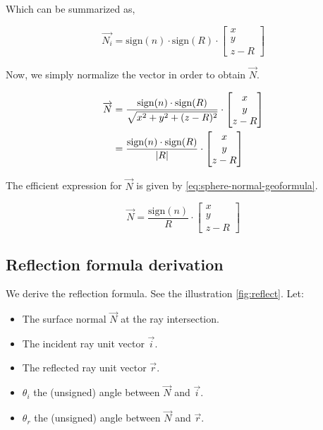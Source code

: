 Which can be summarized as,

\begin{equation}
\overrightarrow{N_i} = \textrm{sign}(n) \cdot \textrm{sign}(R) \cdot
\begin{bmatrix} x \\ y \\ z - R \end{bmatrix}
\end{equation}

Now, we simply normalize the vector in order to obtain $\overrightarrow{N}$.

\begin{equation} \begin{split}
\overrightarrow{N} &= \frac{\textrm{sign}(n) \cdot \textrm{sign}(R)}
{\sqrt{x^2 + y^2 + (z-R)^2}} \cdot
\begin{bmatrix} x \\ y \\ z - R\end{bmatrix} \\
&= \frac{\textrm{sign}(n) \cdot \textrm{sign}(R)}{\abs{R}} \cdot
\begin{bmatrix} x \\ y \\ z - R\end{bmatrix}
\end{split} \end{equation}

The efficient expression for $\overrightarrow{N}$ is given by
\cref{eq:sphere-normal-geoformula}.

\begin{equation} \label{eq:sphere-normal-geoformula}
\overrightarrow{N} = \frac{\textrm{sign}(n)}{R} \cdot
\begin{bmatrix} x \\ y \\ z - R\end{bmatrix}
\end{equation}

\subsection{Reflection formula derivation}
We derive the reflection formula. See the illustration \cref{fig:reflect}.
Let: \begin{itemize}
\item The surface normal $\overrightarrow{N}$ at the ray intersection.
\item The incident ray unit vector $\overrightarrow{i}$.
\item The reflected ray unit vector $\overrightarrow{r}$.
\item $\theta_i$ the (unsigned) angle between $\overrightarrow{N}$ and
      $\overrightarrow{i}$.
\item $\theta_r$ the (unsigned) angle between $\overrightarrow{N}$ and
      $\overrightarrow{r}$.
\end{itemize}

